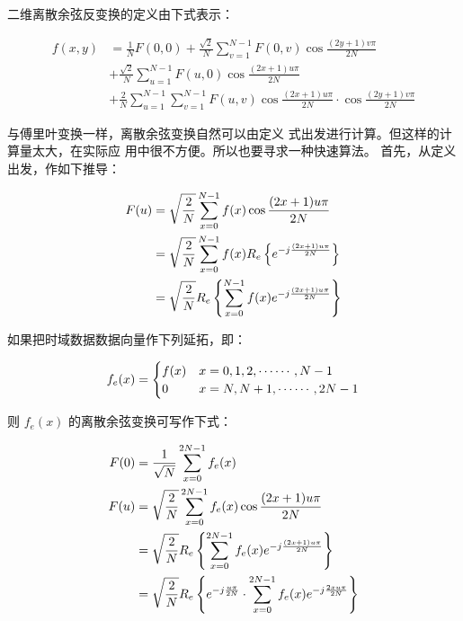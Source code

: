 二维离散余弦反变换的定义由下式表示：

\begin{equation}
\begin{aligned}
f(x, y) & =\frac{1}{N} F(0,0)+\frac{\sqrt{2}}{N} \sum_{v=1}^{N-1} F(0, v) \cos \frac{(2 y+1) v \pi}{2 N} \\
& +\frac{\sqrt{2}}{N} \sum_{u=1}^{N-1} F(u, 0) \cos \frac{(2 x+1) u \pi}{2 N} \\
& +\frac{2}{N} \sum_{u=1}^{N-1} \sum_{v=1}^{N-1} F(u, v) \cos \frac{(2 x+1) u \pi}{2 N} \cdot \cos \frac{(2 y+1) v \pi}{2 N}
\end{aligned}
\end{equation}

与傅里叶变换一样，离散余弦变换自然可以由定义 式出发进行计算。但这样的计算量太大，在实际应 用中很不方便。所以也要寻求一种快速算法。 首先，从定义出发，作如下推导：

\begin{equation}
\begin{aligned}
F(u) & =\sqrt{\frac{2}{N}} \sum_{x=0}^{N-1} f(x) \cos \frac{(2 x+1) u \pi}{2 N} \\
& =\sqrt{\frac{2}{N}} \sum_{x=0}^{N-1} f(x) R_e\left\{e^{-j \frac{(2 x+1) u \pi}{2 N}}\right\} \\
& =\sqrt{\frac{2}{N}} R_e\left\{\sum_{x=0}^{N-1} f(x) e^{-j \frac{(2 x+1) u \pi}{2 N}}\right\}
\end{aligned}
\vspace{0.3cm}
\end{equation}

如果把时域数据数据向量作下列延拓，即：

\begin{equation}
f_e(x)= \begin{cases}f(x) & x=0,1,2, \cdots \cdots, N-1 \\ 0 & x=N, N+1, \cdots \cdots, 2 N-1\end{cases}
\vspace{0.3cm}
\end{equation}

则 $f_e(x)$ 的离散余弦变换可写作下式：

\begin{equation}
\begin{aligned}
F(0) & =\frac{1}{\sqrt{N}} \sum_{x=0}^{2 N-1} f_e(x) \\
F(u) & =\sqrt{\frac{2}{N}} \sum_{x=0}^{2 N-1} f_e(x) \cos \frac{(2 x+1) u \pi}{2 N} \\
& =\sqrt{\frac{2}{N}} R_e\left\{\sum_{x=0}^{2 N-1} f_e(x) e^{-j \frac{(2 x+1) u \pi}{2 N}}\right\} \\
& =\sqrt{\frac{2}{N}} R_e\left\{e^{-j \frac{u \pi}{2 N}} \cdot \sum_{x=0}^{2 N-1} f_e(x) e^{-j \frac{2 x u \pi}{2 N}}\right\}
\end{aligned}
\vspace{0.3cm}
\end{equation}

